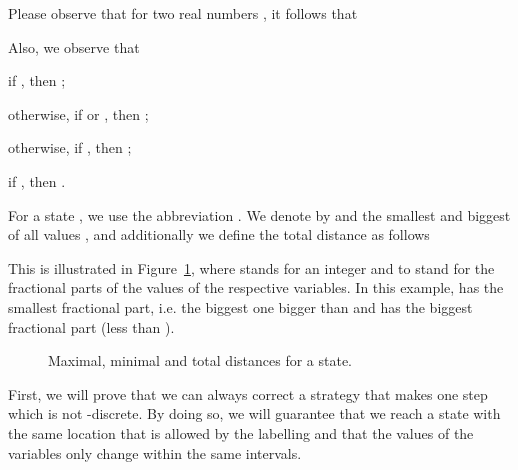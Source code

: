\documentclass[fleqn,envcountsame]{LMCS}
\newcommand{\ie}{i.e.\xspace}
\begin{document}
Please observe that for two real numbers ,
it follows that

Also, we observe that 
\begin{iteMize}{}
\item if , then ;
\item otherwise, if   or , then ;
\item otherwise, if , then ;
\item if , then .
\end{iteMize}


For a state , we use the abbreviation .
We denote by  and
 the smallest and biggest
of all values , and additionally we define the total distance
as follows


This is illustrated in Figure~\ref{fig-total-dists}, where  stands for 
an integer and  to  stand for the fractional parts of the values 
of the respective variables.
In this example,  has the smallest fractional part, \ie the biggest one bigger
than  and  has the biggest fractional part (less than ).

\begin{figure}[b]
\begin{center}
\end{center}
\caption{Maximal, minimal and total distances for a state.}
\label{fig-total-dists}
\end{figure}

First, we will prove that we can always correct a strategy that makes
one step which is not -discrete. By doing so, we will
guarantee that we reach a state with the same location that is allowed
by the labelling and that the values of the variables only change
within the same intervals.
\end{document}
